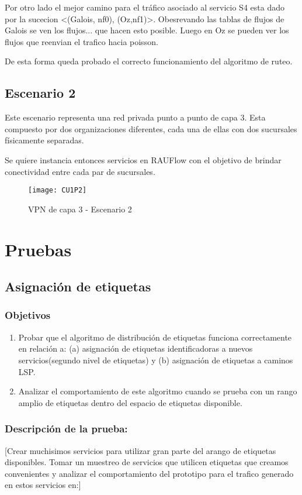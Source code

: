 Por otro lado el mejor camino para el tr\'afico asociado al servicio S4 esta dado por la sucecion <(Galois, nf0), (Oz,nf1)>. Obesrevando las tablas de flujos de Galois se ven los flujos... que hacen esto posible. Luego en Oz se pueden ver los flujos que reenvian el trafico hacia poisson.

De esta forma queda probado el correcto funcionamiento del algoritmo de ruteo.
\newpage
\subsection{Escenario 2}

Este escenario representa una red privada punto a punto de capa 3. Esta compuesto por dos organizaciones diferentes, cada una de ellas con dos sucursales f\'isicamente separadas.

Se quiere instancia entonces servicios en RAUFlow con el objetivo de brindar conectividad entre cada par de sucursales.
 
\begin{figure}[ht!] 
\centering    
\texttt{[image: CU1P2]}
\caption[VPN de capa 3 - Escenario 2]{VPN de capa 3 - Escenario 2}
\label{fig:CUP2}
\end{figure}

\section{Pruebas}

\subsection{Asignación de etiquetas}

\subsubsection{Objetivos}
\begin{enumerate}
\item Probar que el algoritmo de distribución de etiquetas funciona correctamente en relación a: (a) asignación de etiquetas identificadoras a nuevos servicios(segundo nivel de etiquetas) y (b) asignación de etiquetas a caminos LSP.
\item Analizar el comportamiento de este algoritmo cuando se prueba con un rango amplio de etiquetas dentro del espacio de etiquetas disponible.
\end{enumerate}

\subsubsection{Descripción de la prueba:}
[Crear muchisimos servicios para utilizar gran parte del arango de etiquetas disponibles. Tomar un muestreo de servicios que utilicen etiquetas que creamos convenientes y analizar el comportamiento del prototipo para el trafico generado en estos servicios en:]

